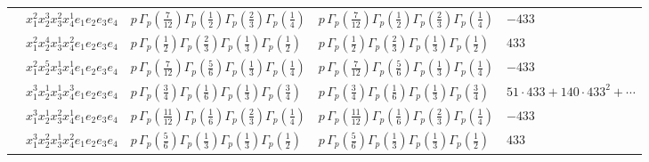 \documentclass[11pt]{article}
\begin{document}
\begin{table}[ht]
{\begin{tabular}{@{}lllll@{}}
 & $x_{1}^{2} x_{2}^{3} x_{3}^{2} x_{4}^{1}  e_{1} e_{2} e_{3} e_{4}$ & $p \, \Gamma_p \left( \frac{7}{12} \right) \Gamma_p \left( \frac{1}{2} \right) \Gamma_p \left( \frac{2}{3} \right) \Gamma_p \left( \frac{1}{4} \right)$ & $p \, \Gamma_p \left( \frac{7}{12} \right) \Gamma_p \left( \frac{1}{2} \right) \Gamma_p \left( \frac{2}{3} \right) \Gamma_p \left( \frac{1}{4} \right)$ & $-433$ \\
 & $x_{1}^{2} x_{2}^{4} x_{3}^{1} x_{4}^{2}  e_{1} e_{2} e_{3} e_{4}$ & $p \, \Gamma_p \left( \frac{1}{2} \right) \Gamma_p \left( \frac{2}{3} \right) \Gamma_p \left( \frac{1}{3} \right) \Gamma_p \left( \frac{1}{2} \right)$ & $p \, \Gamma_p \left( \frac{1}{2} \right) \Gamma_p \left( \frac{2}{3} \right) \Gamma_p \left( \frac{1}{3} \right) \Gamma_p \left( \frac{1}{2} \right)$ & $433$ \\
 & $x_{1}^{2} x_{2}^{5} x_{3}^{1} x_{4}^{1}  e_{1} e_{2} e_{3} e_{4}$ & $p \, \Gamma_p \left( \frac{7}{12} \right) \Gamma_p \left( \frac{5}{6} \right) \Gamma_p \left( \frac{1}{3} \right) \Gamma_p \left( \frac{1}{4} \right)$ & $p \, \Gamma_p \left( \frac{7}{12} \right) \Gamma_p \left( \frac{5}{6} \right) \Gamma_p \left( \frac{1}{3} \right) \Gamma_p \left( \frac{1}{4} \right)$ & $-433$ \\
 & $x_{1}^{3} x_{2}^{1} x_{3}^{1} x_{4}^{3}  e_{1} e_{2} e_{3} e_{4}$ & $p \, \Gamma_p \left( \frac{3}{4} \right) \Gamma_p \left( \frac{1}{6} \right) \Gamma_p \left( \frac{1}{3} \right) \Gamma_p \left( \frac{3}{4} \right)$ & $p \, \Gamma_p \left( \frac{3}{4} \right) \Gamma_p \left( \frac{1}{6} \right) \Gamma_p \left( \frac{1}{3} \right) \Gamma_p \left( \frac{3}{4} \right)$ & $51{\cdot}433{+}140{\cdot}433^{2}{+}\cdots$ \\
 & $x_{1}^{3} x_{2}^{1} x_{3}^{2} x_{4}^{1}  e_{1} e_{2} e_{3} e_{4}$ & $p \, \Gamma_p \left( \frac{11}{12} \right) \Gamma_p \left( \frac{1}{6} \right) \Gamma_p \left( \frac{2}{3} \right) \Gamma_p \left( \frac{1}{4} \right)$ & $p \, \Gamma_p \left( \frac{11}{12} \right) \Gamma_p \left( \frac{1}{6} \right) \Gamma_p \left( \frac{2}{3} \right) \Gamma_p \left( \frac{1}{4} \right)$ & $-433$ \\
 & $x_{1}^{3} x_{2}^{2} x_{3}^{1} x_{4}^{2}  e_{1} e_{2} e_{3} e_{4}$ & $p \, \Gamma_p \left( \frac{5}{6} \right) \Gamma_p \left( \frac{1}{3} \right) \Gamma_p \left( \frac{1}{3} \right) \Gamma_p \left( \frac{1}{2} \right)$ & $p \, \Gamma_p \left( \frac{5}{6} \right) \Gamma_p \left( \frac{1}{3} \right) \Gamma_p \left( \frac{1}{3} \right) \Gamma_p \left( \frac{1}{2} \right)$ & $433$ \\

\end{tabular}}
\end{table}
\end{document}

